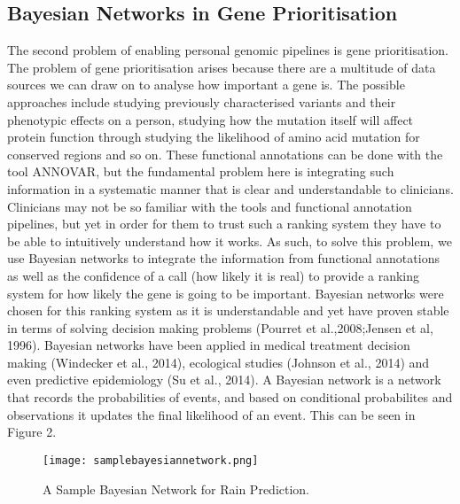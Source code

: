 \documentclass{article}
\begin{document}
\subsection{Bayesian Networks in Gene Prioritisation}
The second problem of enabling personal genomic pipelines is gene prioritisation. The problem of gene prioritisation arises because there are a multitude of data sources we can draw on to analyse how important a gene is. The possible approaches include studying previously characterised variants and their phenotypic effects on a person, studying how the mutation itself will affect protein function through studying the likelihood of amino acid mutation for conserved regions and so on. These functional annotations can be done with the tool ANNOVAR, but the fundamental problem here is integrating such information in a systematic manner that is clear and understandable to clinicians. Clinicians may not be so familiar with the tools and functional annotation pipelines, but yet in order for them to trust such a ranking system they have to be able to intuitively understand how it works. As such, to solve this problem, we use Bayesian networks to integrate the information from functional annotations as well as the confidence of a call (how likely it is real) to provide a ranking system for how likely the gene is going to be important. Bayesian networks were chosen for this ranking system as it is understandable and yet have proven stable in terms of solving decision making problems (Pourret et al.,2008;Jensen et al, 1996). Bayesian networks have been applied in medical treatment decision making (Windecker et al., 2014), ecological studies (Johnson et al., 2014) and even predictive epidemiology (Su et al., 2014). A Bayesian network is a network that records the probabilities of events, and based on conditional probabilites and observations it updates the final likelihood of an event. This can be seen in Figure 2.

\begin{figure}[H]
\texttt{[image: samplebayesiannetwork.png]}
\centering
\caption{A Sample Bayesian Network for Rain Prediction.}
\end{figure}
\end{document}
